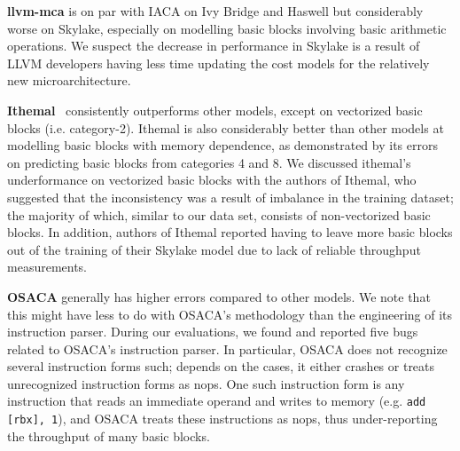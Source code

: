 \textbf{llvm-mca} is on par with IACA on Ivy Bridge and Haswell but considerably worse on Skylake,
especially on modelling basic blocks involving basic arithmetic operations.
We suspect the decrease in performance in Skylake is a result of LLVM developers 
having less time updating the cost models for the relatively new microarchitecture.

\textbf{Ithemal}~\cite{ithemal} consistently outperforms other models, except on vectorized basic blocks (i.e. category-2).
Ithemal is also considerably better than other models at modelling basic blocks with memory dependence,
as demonstrated by its errors on predicting basic blocks from categories 4 and 8.
We discussed ithemal's underformance on vectorized basic blocks with the authors of Ithemal, who suggested that the inconsistency
was a result of imbalance in the training dataset;
the majority of which, similar to our data set, consists of non-vectorized basic blocks.
In addition, authors of Ithemal reported having to leave more basic blocks out of the training of their
Skylake model due to lack of reliable throughput measurements.

\textbf{OSACA}\cite{osaca} generally has higher errors compared to other models.
We note that this might have less to do with OSACA's methodology than the engineering of its instruction parser.
During our evaluations, we found and reported five bugs related to OSACA's instruction parser.
In particular, OSACA does not recognize several instruction forms such;
depends on the cases, it either crashes or treats unrecognized instruction forms as nops.
One such instruction form is any instruction that reads an immediate operand and writes to memory
(e.g. \verb|add [rbx], 1|), and OSACA treats these instructions as nops, thus under-reporting the throughput of
many basic blocks.


